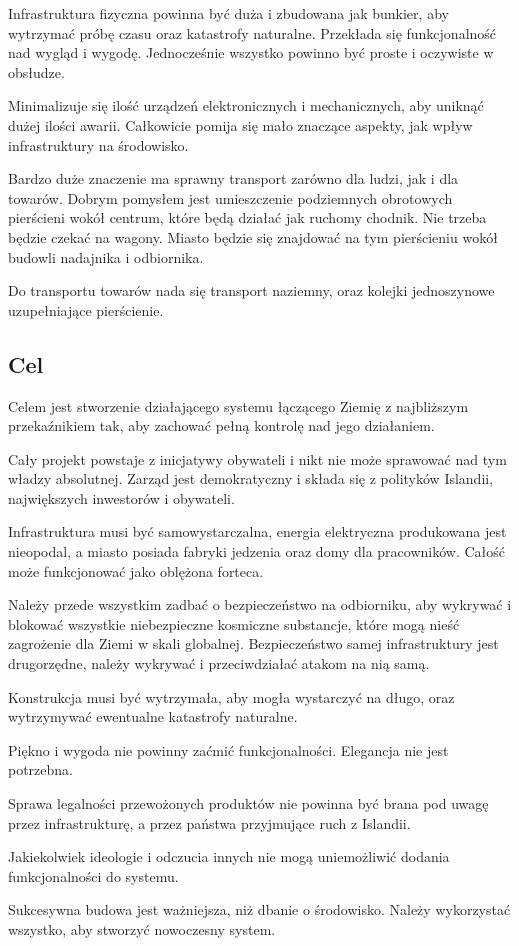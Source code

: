 Infrastruktura fizyczna powinna być duża i zbudowana jak bunkier, aby wytrzymać próbę czasu oraz katastrofy naturalne.
Przekłada się funkcjonalność nad wygląd i wygodę.
Jednocześnie wszystko powinno być proste i oczywiste w obsłudze.

Minimalizuje się ilość urządzeń elektronicznych i mechanicznych, aby uniknąć dużej ilości awarii.
Całkowicie pomija się mało znaczące aspekty, jak wpływ infrastruktury na środowisko.

Bardzo duże znaczenie ma sprawny transport zarówno dla ludzi, jak i dla towarów.
Dobrym pomysłem jest umieszczenie podziemnych obrotowych pierścieni wokół centrum, które będą działać jak ruchomy chodnik. Nie trzeba będzie czekać na wagony.
Miasto będzie się znajdować na tym pierścieniu wokół budowli nadajnika i odbiornika.

Do transportu towarów nada się transport naziemny, oraz kolejki jednoszynowe uzupełniające pierścienie.

\subsection{Cel}
Celem jest stworzenie działającego systemu łączącego Ziemię z najbliższym przekaźnikiem tak, aby zachować pełną kontrolę nad jego działaniem.

Cały projekt powstaje z inicjatywy obywateli i nikt nie może sprawować nad tym władzy absolutnej. Zarząd jest demokratyczny i składa się z polityków Islandii, największych inwestorów i obywateli.

Infrastruktura musi być samowystarczalna, energia elektryczna produkowana jest nieopodal, a miasto posiada fabryki jedzenia oraz domy dla pracowników. Całość może funkcjonować jako oblężona forteca.

Należy przede wszystkim zadbać o bezpieczeństwo na odbiorniku, aby wykrywać i blokować wszystkie niebezpieczne kosmiczne substancje, które mogą nieść zagrożenie dla Ziemi w skali globalnej.
Bezpieczeństwo samej infrastruktury jest drugorzędne, należy wykrywać i przeciwdziałać atakom na nią samą.

Konstrukcja musi być wytrzymała, aby mogła wystarczyć na długo, oraz wytrzymywać ewentualne katastrofy naturalne.

Piękno i wygoda nie powinny zaćmić funkcjonalności. Elegancja nie jest potrzebna.

Sprawa legalności przewożonych produktów nie powinna być brana pod uwagę przez infrastrukturę, a przez państwa przyjmujące ruch z Islandii.

Jakiekolwiek ideologie i odczucia innych nie mogą uniemożliwić dodania funkcjonalności do systemu. 

Sukcesywna budowa jest ważniejsza, niż dbanie o środowisko. Należy wykorzystać wszystko, aby stworzyć nowoczesny system.

